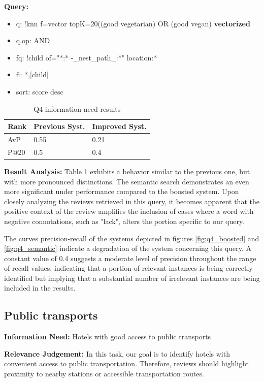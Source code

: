 \documentclass[sigconf]{acmart}
\begin{document}
\textbf{Query:}

\begin{itemize}
    \item q: {!knn f=vector topK=20}((good vegetarian) OR (good vegan) \textbf{vectorized}
    \item q.op: AND
    \item fq: {!child of="*:* -\_nest\_path\_:*"} location:*
    \item fl: *,[child]
    \item sort: score desc
\end{itemize}

\begin{table}[H]
\caption{Q4 information need results}
\label{tab:q9}
\begin{tabular}{lll}
\toprule
Rank & Previous Syst. & Improved Syst.\\
\midrule
AvP & 0.55 & 0.21  \\
P@20 & 0.5 & 0.4 \\
\bottomrule
\end{tabular}
\end{table}

\textbf{Result Analysis:} Table \ref{tab:q9} exhibits a behavior similar to the previous one, but with more pronounced distinctions. The semantic search demonstrates an even more significant under performance compared to the boosted system. 
Upon closely analyzing the reviews retrieved in this query, it becomes apparent that the positive context of the review amplifies the inclusion of cases where a word with negative connotations, such as "lack", alters the portion specific to our query.

The curves precision-recall of the systems depicted in figures \ref{fig:q4_boosted} and \ref{fig:q4_semantic} indicate a degradation of the system concerning this query. A constant value of 0.4 suggests a moderate level of precision throughout the range of recall values, indicating that a portion of relevant instances is being correctly identified but implying that a substantial number of irrelevant instances are being included in the results.

\subsection{Public transports}

\textbf{Information Need:} Hotels with good access to public transports

\textbf{Relevance Judgement:} In this task, our goal is to identify hotels with convenient access to public transportation. Therefore, reviews should highlight proximity to nearby stations or accessible transportation routes.
\end{document}
